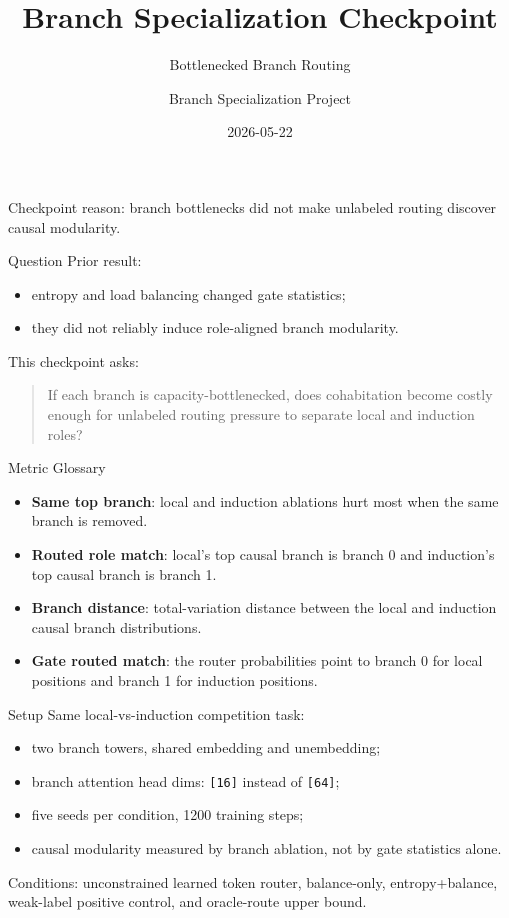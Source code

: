 \documentclass[aspectratio=169]{beamer}
\title{Branch Specialization Checkpoint}
\subtitle{Bottlenecked Branch Routing}
\author{Branch Specialization Project}
\date{2026-05-22}
\begin{document}
\begin{frame}
  \titlepage
  \vspace{-0.5em}
  \begin{center}
    Checkpoint reason: branch bottlenecks did not make unlabeled routing discover causal modularity.
  \end{center}
\end{frame}

\begin{frame}{Question}
  Prior result:
  \begin{itemize}
    \item entropy and load balancing changed gate statistics;
    \item they did not reliably induce role-aligned branch modularity.
  \end{itemize}

  \vspace{0.8em}
  This checkpoint asks:

  \begin{quote}
    If each branch is capacity-bottlenecked, does cohabitation become costly
    enough for unlabeled routing pressure to separate local and induction roles?
  \end{quote}
\end{frame}

\begin{frame}{Metric Glossary}
  \begin{itemize}
    \item \textbf{Same top branch}: local and induction ablations hurt most when the same branch is removed.
    \item \textbf{Routed role match}: local's top causal branch is branch 0 and induction's top causal branch is branch 1.
    \item \textbf{Branch distance}: total-variation distance between the local and induction causal branch distributions.
    \item \textbf{Gate routed match}: the router probabilities point to branch 0 for local positions and branch 1 for induction positions.
  \end{itemize}
\end{frame}

\begin{frame}{Setup}
  Same local-vs-induction competition task:
  \begin{itemize}
    \item two branch towers, shared embedding and unembedding;
    \item branch attention head dims: \texttt{[16]} instead of \texttt{[64]};
    \item five seeds per condition, 1200 training steps;
    \item causal modularity measured by branch ablation, not by gate statistics alone.
  \end{itemize}

  \vspace{0.6em}
  Conditions: unconstrained learned token router, balance-only, entropy+balance,
  weak-label positive control, and oracle-route upper bound.
\end{frame}
\end{document}
